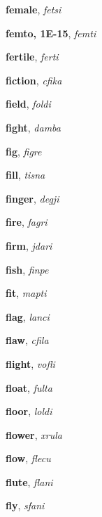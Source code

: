 \documentclass[12pt]{book}
\begin{document}
\begin{description}
\item[ ] \textbf{female}, \textit{fetsi}

\item[ ] \textbf{femto, 1E-15}, \textit{femti}

\item[ ] \textbf{fertile}, \textit{ferti}

\item[ ] \textbf{fiction}, \textit{cfika}

\item[ ] \textbf{field}, \textit{foldi}

\item[ ] \textbf{fight}, \textit{damba}

\item[ ] \textbf{fig}, \textit{figre}

\item[ ] \textbf{fill}, \textit{tisna}

\item[ ] \textbf{finger}, \textit{degji}

\item[ ] \textbf{fire}, \textit{fagri}

\item[ ] \textbf{firm}, \textit{jdari}

\item[ ] \textbf{fish}, \textit{finpe}

\item[ ] \textbf{fit}, \textit{mapti}

\item[ ] \textbf{flag}, \textit{lanci}

\item[ ] \textbf{flaw}, \textit{cfila}

\item[ ] \textbf{flight}, \textit{vofli}

\item[ ] \textbf{float}, \textit{fulta}

\item[ ] \textbf{floor}, \textit{loldi}

\item[ ] \textbf{flower}, \textit{xrula}

\item[ ] \textbf{flow}, \textit{flecu}

\item[ ] \textbf{flute}, \textit{flani}

\item[ ] \textbf{fly}, \textit{sfani}


\end{description}
\end{document}
